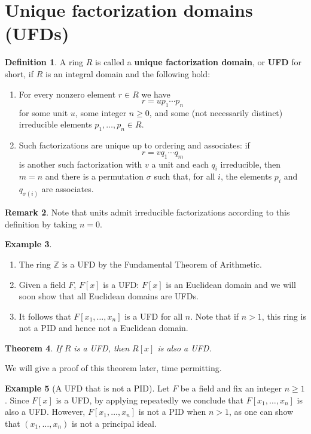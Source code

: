 \documentclass[12pt]{report}
\newtheorem{theorem}{Theorem}[chapter]
\numberwithin{equation}{section}
\numberwithin{theorem}{chapter}
\theoremstyle{definition}
\newtheorem{definition}[theorem]{Definition}
\newtheorem{example}[theorem]{Example}
\newtheorem*{basic properties}{Basic Properties}
\newtheorem*{Important Remark}{Important Remark}
\newtheorem{remark}[theorem]{Remark}
\newcommand{\df}[1]{{\bf #1}\index{#1}}
\begin{document}
\section{Unique factorization domains (UFDs)}


\begin{definition}
A ring $R$ is called a \df{unique factorization domain}, or \df{UFD} for short, if $R$ is an integral domain and the following hold:
\begin{enumerate}
\item  For every nonzero element $r \in R$  we have 
$$r = up_1 \cdots p_n$$
for some unit $u$, some integer $n \geqslant 0$, and some (not necessarily distinct) irreducible elements $p_1, \dots, p_n  \in R$.
\item Such factorizations are unique up to ordering and associates: if
$$r = vq_1 \cdots q_m$$
is another such factorization with $v$ a unit and each $q_i$ irreducible, then $m = n$ and there is a permutation $\sigma$ such that, for all $i$, the elements $p_i$ and $q_{\sigma(i)}$ are associates.
\end{enumerate}
\end{definition}


\begin{remark} 
Note that units admit irreducible factorizations according to this definition by taking $n = 0$.
\end{remark}


\begin{example}
\begin{enumerate}
\item The ring $\mathbb{Z}$ is a UFD by the Fundamental Theorem of Arithmetic.
\item Given a field $F$, $F[x]$ is a UFD: $F[x]$ is an Euclidean domain and we will soon show that all Euclidean domains are UFDs.
\item It follows that $F[x_1, \dots, x_n]$ is a UFD for all $n$. Note that if $n > 1$, this ring is not a PID and hence not a Euclidean domain.
\end{enumerate}
\end{example}


\begin{theorem}\label{R ufd => R[x] ufd}
	If $R$ is a UFD, then $R[x]$ is also a UFD.
\end{theorem}

We will give a proof of this theorem later, time permitting.


\begin{example}[A UFD that is not a PID]
Let $F$ be a field and fix an integer $n \geqslant 1$. Since $F[x]$ is a UFD, by applying  repeatedly we conclude that $F[x_1, \dots, x_n]$ is also a UFD. However, $F[x_1, \ldots, x_n]$ is not a PID when $n>1$, as one can show that $(x_1, \ldots, x_n)$ is not a principal ideal.
\end{example}
\end{document}
